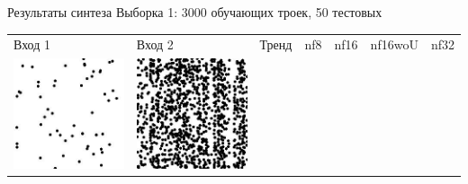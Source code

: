 \documentclass[12pt]{beamer}
\begin{document}
	\begin{frame}{Результаты синтеза}
		Выборка 1: 3000 обучающих троек, 50 тестовых
		\begin{table}
			\begin{center}
				\begin{tabular}{p{1.2cm} p{1.2cm} p{1.2cm} p{1.2cm} p{1.2cm} p{1.2cm} p{1.2cm}}
					\toprule
					Вход 1 & Вход 2 & Тренд & nf8 & nf16 & nf16woU & nf32 \\
					\cmidrule(r){1-1}\cmidrule(lr){2-2}\cmidrule(lr){3-3}\cmidrule(lr){4-4}\cmidrule(lr){5-5}\cmidrule(lr){6-6}\cmidrule(l){7-7}
					\includegraphics[width=1\linewidth]{8-results/sand-trend2/left1}
					&
					\includegraphics[width=1\linewidth]{8-results/sand-trend2/right1}

\end{tabular}
\end{center}
\end{table}
\end{frame}
\end{document}
